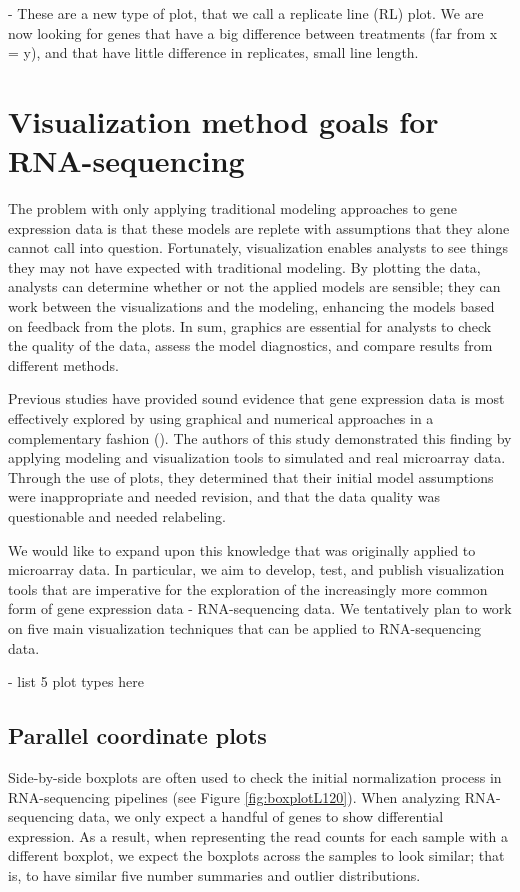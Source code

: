 \documentclass[11pt,a4paper,oldfontcommands,openany]{memoir}
\numberwithin{equation}{section} %
\begin{document}
- These are a new type of plot, that we call a replicate line (RL) plot. We are now looking for genes that have a big difference between treatments (far from x = y), and that have little difference in replicates, small line length.

\chapter{Visualization method goals for RNA-sequencing}

The problem with only applying traditional modeling approaches to gene expression data is that these models are replete with assumptions that they alone cannot call into question. Fortunately, visualization enables analysts to see things they may not have expected with traditional modeling. By plotting the data, analysts can determine whether or not the applied models are sensible; they can work between the visualizations and the modeling, enhancing the models based on feedback from the plots. In sum, graphics are essential for analysts to check the quality of the data, assess the model diagnostics, and compare results from different methods.

Previous studies have provided sound evidence that gene expression data is most effectively explored by using graphical and numerical approaches in a complementary fashion (\citealt{jds}). The authors of this study demonstrated this finding by applying modeling and visualization tools to simulated and real microarray data. Through the use of plots, they determined that their initial model assumptions were inappropriate and needed revision, and that the data quality was questionable and needed relabeling. 

We would like to expand upon this knowledge that was originally applied to microarray data. In particular, we aim to develop, test, and publish visualization tools that are imperative for the exploration of the increasingly more common form of gene expression data - RNA-sequencing data. We tentatively plan to work on five main visualization techniques that can be applied to RNA-sequencing data.

- list 5 plot types here

\section{Parallel coordinate plots}

Side-by-side boxplots are often used to check the initial normalization process in RNA-sequencing pipelines (see Figure \ref{fig:boxplotL120}). When analyzing RNA-sequencing data, we only expect a handful of genes to show differential expression. As a result, when representing the read counts for each sample with a different boxplot, we expect the boxplots across the samples to look similar; that is, to have similar five number summaries and outlier distributions.
\end{document}
